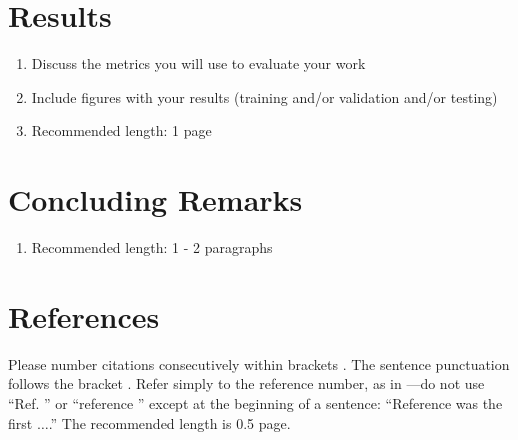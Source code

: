 \documentclass[conference]{IEEEtran}
\begin{document}
\section{Results}
\begin{enumerate}
    \item  Discuss the metrics you will use to evaluate your work

    \item Include figures with your results (training and/or validation and/or testing)

    \item Recommended length: 1 page
\end{enumerate}
\section{Concluding Remarks}

\begin{enumerate}
    \item Recommended length: 1 - 2 paragraphs
\end{enumerate}


\section*{References}

Please number citations consecutively within brackets \cite{vahidian-iccv23}. The
sentence punctuation follows the bracket \cite{int-icml20}. Refer simply to the reference
number, as in \cite{int-icml20}---do not use ``Ref. \cite{int-icml20}'' or ``reference \cite{int-icml20}'' except at
the beginning of a sentence: ``Reference \cite{replay-buff-neurips19} was the first $\ldots$.'' The recommended length is 0.5 page.




\end{document}
